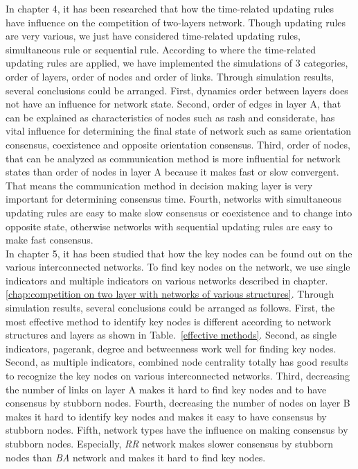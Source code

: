 In chapter 4, it has been researched that how the time-related updating rules have influence on the competition of two-layers network. Though updating rules are very various, we just have considered time-related updating rules, simultaneous rule or sequential rule. According to where the time-related updating rules are applied, we have implemented the simulations of 3 categories, order of layers, order of nodes and order of links. Through simulation results, several conclusions could be arranged. First, dynamics order between layers does not have an influence for network state. Second, order of edges in layer A, that can be explained as characteristics of nodes such as rash and considerate, has vital influence for determining the final state of network such as same orientation consensus, coexistence and opposite orientation consensus. Third, order of nodes, that can be analyzed as communication method is more influential for network states than order of nodes in layer A because it makes fast or slow convergent. That means the communication method in decision making layer is very important for determining consensus time. Fourth, networks with simultaneous updating rules are easy to make slow consensus or coexistence and to change into opposite state, otherwise networks with sequential updating rules are easy to make fast consensus. \\

In chapter 5, it has been studied that how the key nodes can be found out on the various interconnected networks. To find key nodes on the network, we use single indicators and multiple indicators on various networks described in chapter.\ref{chap:competition on two layer with networks of various structures}. Through simulation results, several conclusions could be arranged as follows.
First, the most effective method to identify key nodes is different according to network structures and layers as shown in Table.~\ref{effective methods}. Second, as single indicators, pagerank, degree and betweenness work well for finding key nodes. Second, as multiple indicators, combined node centrality totally has good results to recognize the key nodes on various interconnected networks. Third, decreasing the number of links on layer A makes it hard to find key nodes and to have consensus by stubborn nodes.  Fourth, decreasing the number of nodes on layer B makes it hard to identify key nodes and makes it easy to have consensus by stubborn nodes. Fifth, network types have the influence on making consensus by stubborn nodes. Especially, \textit{RR} network makes slower consensus by stubborn nodes than \textit{BA} network and makes it hard to find key nodes. 
  
